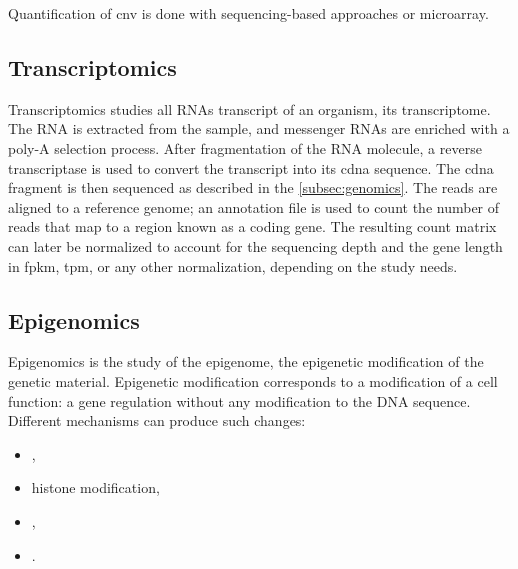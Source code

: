 \documentclass[../main.tex]{subfiles}
\begin{document}
		Quantification of \gls{cnv} is done with sequencing-based approaches or microarray.

	\subsection{Transcriptomics}\label{subsec:transcriptomics}
		Transcriptomics studies all RNAs transcript of an organism, \ie{}its transcriptome.
		The RNA is extracted from the sample, and messenger RNAs are enriched with a poly-A selection process.
		After fragmentation of the RNA molecule, a reverse transcriptase is used to convert the transcript into its \gls{cdna} sequence.
		The \gls{cdna} fragment is then sequenced as described in the \cref{subsec:genomics}.
		The reads are aligned to a reference genome; an annotation file is used to count the number of reads that map to a region known as a coding gene.
		The resulting count matrix can later be normalized to account for the sequencing depth and the gene length in \gls{fpkm}, \gls{tpm}, or any other normalization, depending on the study needs.

	\subsection{Epigenomics}
		Epigenomics is the study of the epigenome, the epigenetic modification of the genetic material.
		Epigenetic modification corresponds to a modification of a cell function: a gene regulation without any modification to the DNA sequence.
		Different mechanisms can produce such changes:
		\begin{itemize}[nosep]
			\item {},
			\item histone modification,
			\item {},
			\item {}.
		\end{itemize}

\end{document}
